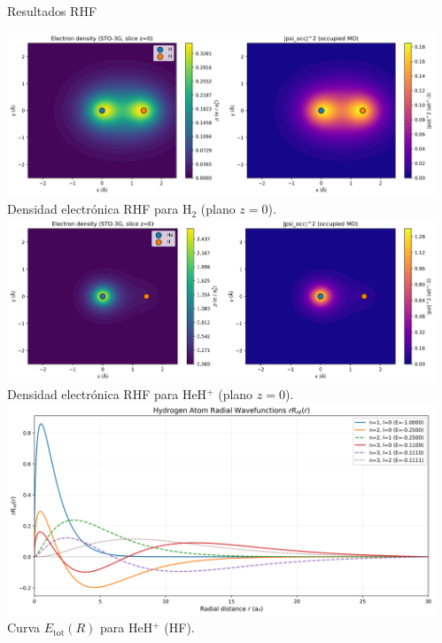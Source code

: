 \documentclass[final]{beamer}
\begin{document}
\begin{frame}[t]
\begin{columns}[t,totalwidth=\textwidth]
\begin{column}{0.36\textwidth}
\begin{block}{Resultados RHF}
\begin{center}
\includegraphics[width=0.95\linewidth]{densityh2.png}\\[-0.2em]
{\small Densidad electrónica RHF para H$_2$ (plano $z=0$).}\\[0.6em]
\includegraphics[width=0.95\linewidth]{densityheh.png}\\[-0.2em]
{\small Densidad electrónica RHF para HeH$^+$ (plano $z=0$).}\\[0.6em]
\includegraphics[width=0.95\linewidth]{hydrogen.png}\\[-0.2em]
{\small Curva $E_{\mathrm{tot}}(R)$ para HeH$^+$ (HF).}
\end{center}
\end{block}

\end{column}

\begin{column}{0.32\textwidth}


\end{column}
\end{columns}
\end{frame}
\end{document}

